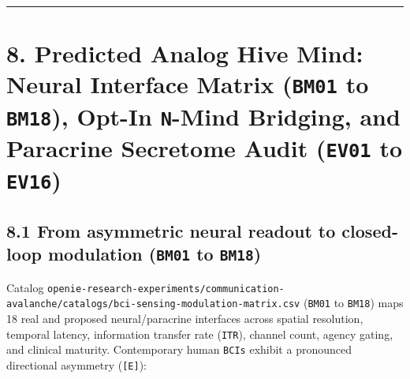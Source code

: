 \documentclass[10pt,letterpaper]{article}
\begin{document}
\begin{center}\rule{0.5\linewidth}{0.5pt}\end{center}

\section{\texorpdfstring{8. Predicted Analog Hive Mind: Neural Interface
Matrix (\texttt{BM01} to \texttt{BM18}), Opt-In \texttt{N}-Mind
Bridging, and Paracrine Secretome Audit (\texttt{EV01} to
\texttt{EV16})}{8. Predicted Analog Hive Mind: Neural Interface Matrix (BM01 to BM18), Opt-In N-Mind Bridging, and Paracrine Secretome Audit (EV01 to EV16)}}\label{predicted-analog-hive-mind-neural-interface-matrix-bm01-to-bm18-opt-in-n-mind-bridging-and-paracrine-secretome-audit-ev01-to-ev16}

\subsection{\texorpdfstring{8.1 From asymmetric neural readout to
closed-loop modulation (\texttt{BM01} to
\texttt{BM18})}{8.1 From asymmetric neural readout to closed-loop modulation (BM01 to BM18)}}\label{from-asymmetric-neural-readout-to-closed-loop-modulation-bm01-to-bm18}

Catalog
\texttt{openie-\allowbreak{}research-\allowbreak{}experiments/\allowbreak{}communication-\allowbreak{}avalanche/\allowbreak{}catalogs/\allowbreak{}bci-\allowbreak{}sensing-\allowbreak{}modulation-\allowbreak{}matrix.\allowbreak{}csv}
(\texttt{BM01} to \texttt{BM18}) maps 18 real and proposed
neural/paracrine interfaces across spatial resolution, temporal latency,
information transfer rate (\texttt{ITR}), channel count, agency gating,
and clinical maturity. Contemporary human \texttt{BCIs} exhibit a
pronounced directional asymmetry (\texttt{{[}E{]}}):
\end{document}
